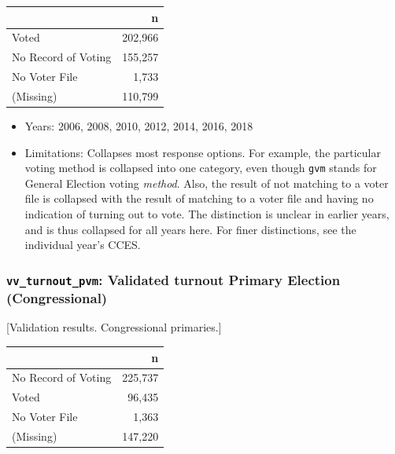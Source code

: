 \documentclass[10pt,article,oneside]{memoir}
\theoremstyle{definition}
\begin{document}
\begin{table}[H]
\centering
\begin{tabular}{lr}
\toprule
 & n\\
\midrule
Voted & 202,966\\
No Record of Voting & 155,257\\
No Voter File & 1,733\\
(Missing) & 110,799\\
\bottomrule
\end{tabular}
\end{table}

\begin{itemize}
\tightlist
\item
  Years: 2006, 2008, 2010, 2012, 2014, 2016, 2018
\item
  Limitations: Collapses most response options. For example, the
  particular voting method is collapsed into one category, even though
  \texttt{gvm} stands for General Election voting \emph{method}. Also,
  the result of not matching to a voter file is collapsed with the
  result of matching to a voter file and having no indication of turning
  out to vote. The distinction is unclear in earlier years, and is thus
  collapsed for all years here. For finer distinctions, see the
  individual year's CCES.
\end{itemize}

\hypertarget{vv_turnout_pvm-validated-turnout-primary-election-congressional}{%
\subsubsection{\texorpdfstring{\texttt{vv\_turnout\_pvm}: Validated
turnout Primary Election
(Congressional)}{vv\_turnout\_pvm: Validated turnout Primary Election (Congressional)}}\label{vv_turnout_pvm-validated-turnout-primary-election-congressional}}

{[}Validation results. Congressional primaries.{]}

\begin{table}[H]
\centering
\begin{tabular}{lr}
\toprule
 & n\\
\midrule
No Record of Voting & 225,737\\
Voted & 96,435\\
No Voter File & 1,363\\
(Missing) & 147,220\\
\bottomrule
\end{tabular}
\end{table}
\end{document}
